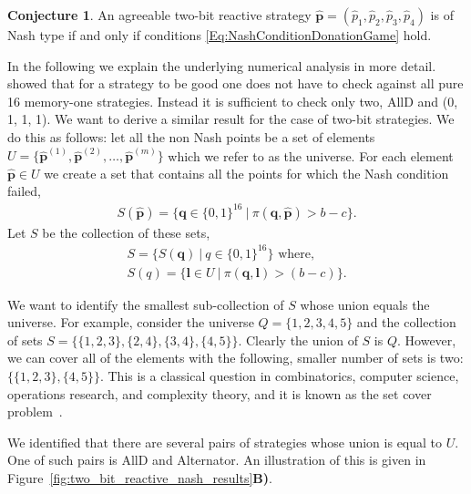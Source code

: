 \documentclass{article}
\theoremstyle{definition}
\newtheorem{conjecture}[theorem]{Conjecture}
\begin{document}
\begin{conjecture}\label{conjecture:nash_from_numerical_results}
An agreeable two-bit reactive strategy \(\mathbf{\hat{p}} = (\hat{p}_{1}, \hat{p}_{2}, \hat{p}_{3}, \hat{p}_{4})\) is of Nash type if and only if conditions \eqref{Eq:NashConditionDonationGame} hold. 
\end{conjecture}

In the following we explain the underlying numerical analysis in more detail. 
\citet{akin:EGADS:2016} showed that for a strategy to be good one does
not have to check against all pure 16 memory-one strategies. 
Instead it is sufficient to check only two, AllD and (0, 1, 1, 1). We want
to derive a similar result for the case of two-bit strategies. We do this as
follows: let all the non Nash points be a
set of elements \(U = \{ \mathbf{\hat{p}}^{(1)}, \mathbf{\hat{p}}^{(2)}, \dots,
\mathbf{\hat{p}}^{(m)}\}\) which we refer to as the universe. For each element $\mathbf{\hat{p}}\in U$
we create a set that contains all the points for which the Nash
condition failed,
 \begin{align*}
 S(\mathbf{\hat{p}}) = \{\mathbf{q}\in\{0,1\}^{16} \ | \ \pi( \mathbf{q},  \mathbf{\hat{p}}) > b\!-\!c\}.
 \end{align*}
Let \(S\) be the collection of these sets,
\begin{align*}
  S = \{S(\mathbf{q}) \ | \ q \in \{0, 1\} ^ {16} \} \text{ where,}\\
  S(q) = \{\mathbf{l} \in U \ | \ \pi( \mathbf{q},  \mathbf{l}) > (b - c)\}.
\end{align*}

We want to identify the smallest sub-collection of \(S\) whose union equals the
universe. For example, consider the universe \(Q = \{1, 2, 3, 4, 5\}\) and the
collection of sets \(S = \{ \{1, 2, 3\}, \{2, 4\}, \{3, 4\}, \{4, 5\} \}\).
Clearly the union of \(S\) is \(Q\). However, we can cover all of the elements
with the following, smaller number of sets is two: \(\{ \{1, 2, 3\}, \{4, 5\}
\}\). This is a classical question in combinatorics, computer science,
operations research, and complexity theory, and it is known as the set cover
problem~\citep{beasley:EJOR:1987}.

We identified that there are several pairs of strategies whose union is
equal to \(U\). One of such pairs is AllD and Alternator. An
illustration of this is
given in Figure~\ref{fig:two_bit_reactive_nash_results}\textbf{B)}.
\end{document}
